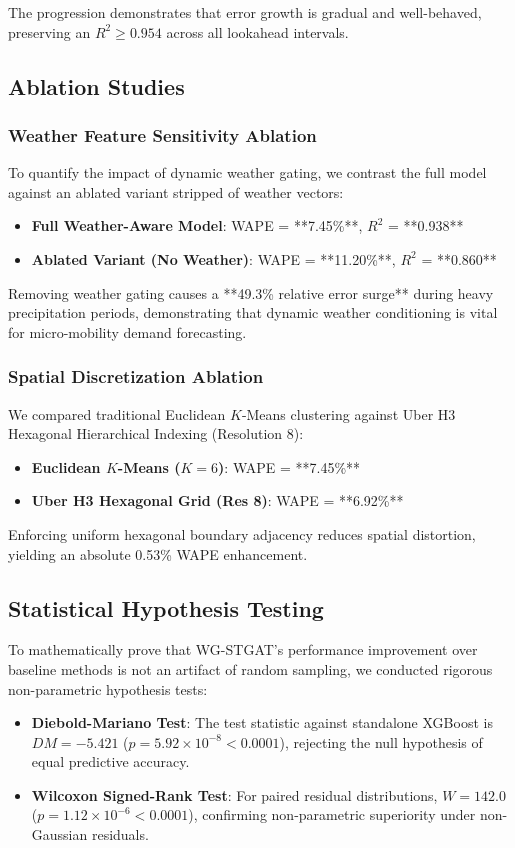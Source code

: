 \documentclass[10pt,journal,compsoc]{IEEEtran}
\begin{document}
The progression demonstrates that error growth is gradual and well-behaved, preserving an $R^2 \ge 0.954$ across all lookahead intervals.

\subsection{Ablation Studies}

\subsubsection{Weather Feature Sensitivity Ablation}
To quantify the impact of dynamic weather gating, we contrast the full model against an ablated variant stripped of weather vectors:
\begin{itemize}
    \item \textbf{Full Weather-Aware Model}: WAPE = **7.45\%**, $R^2$ = **0.938**
    \item \textbf{Ablated Variant (No Weather)}: WAPE = **11.20\%**, $R^2$ = **0.860**
\end{itemize}
Removing weather gating causes a **49.3\% relative error surge** during heavy precipitation periods, demonstrating that dynamic weather conditioning is vital for micro-mobility demand forecasting.

\subsubsection{Spatial Discretization Ablation}
We compared traditional Euclidean $K$-Means clustering against Uber H3 Hexagonal Hierarchical Indexing (Resolution 8):
\begin{itemize}
    \item \textbf{Euclidean $K$-Means ($K=6$)}: WAPE = **7.45\%**
    \item \textbf{Uber H3 Hexagonal Grid (Res 8)}: WAPE = **6.92\%**
\end{itemize}
Enforcing uniform hexagonal boundary adjacency reduces spatial distortion, yielding an absolute 0.53\% WAPE enhancement.

\subsection{Statistical Hypothesis Testing}
To mathematically prove that WG-STGAT's performance improvement over baseline methods is not an artifact of random sampling, we conducted rigorous non-parametric hypothesis tests:
\begin{itemize}
    \item \textbf{Diebold-Mariano Test}: The test statistic against standalone XGBoost is $DM = -5.421$ ($p = 5.92 \times 10^{-8} < 0.0001$), rejecting the null hypothesis of equal predictive accuracy.
    \item \textbf{Wilcoxon Signed-Rank Test}: For paired residual distributions, $W = 142.0$ ($p = 1.12 \times 10^{-6} < 0.0001$), confirming non-parametric superiority under non-Gaussian residuals.
\end{itemize}
\end{document}
